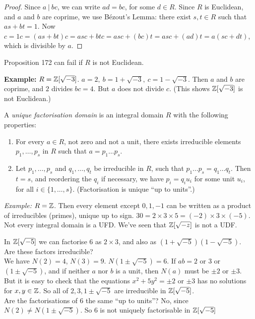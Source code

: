 \documentclass[twoside]{scrartcl}
\begin{document}
 \begin{proof}
 Since $a ~|~ bc$, we can write $ad = bc$, for some $d \in R$. Since $R$ is Euclidean, and $a$ and $b$ are coprime, we use B\'{e}zout's Lemma: there exist $s,t \in R$ such that $as + bt = 1$. Now $c = 1c = (as + bt)c = asc + btc = asc + (bc)t = asc + (ad)t = a(sc + dt)$, which is divisible by $a$. 
 \end{proof}\vspace*{5pt}
 
 Proposition 172 can fail if $R$ is not Euclidean.
 
 \textbf{Example:} $R = \mathbb{Z}[\sqrt{-3}]$. $a = 2, ~b = 1 + \sqrt{-3},~ c = 1-\sqrt{-3}$. Then $a$ and $b$ are coprime, and $2$ divides $bc = 4$. But $a$ does not divide $c$. (This shows $\mathbb{Z}[\sqrt{-3}]$ is not Euclidean.)\\
 
 \begin{definition} A \emph{unique factorisation domain} is an integral domain $R$ with the following properties:\begin{enumerate}
\item For every $a \in R$, not zero and not a unit, there exists irreducible elements $p_1,\dots,p_s$ in $R$ such that $a = p_1\dots p_s$.
\item Let $p_1,\dots,p_s$ and $q_1,\dots,q_t$ be irreducible in $R$, such that $p_1\dots p_s = q_1\dots q_t$. Then $t = s$, and reordering the $q_i$ if necessary, we have $p_i = q_iu_i$ for some unit $u_i$, for all $i \in \{1,\dots,s\}$. (Factorisation is unique ``up to units''.)
\end{enumerate} \end{definition}

\textit{Example:} $R = \mathbb{Z}$. Then every element except $0,1,-1$ can be written as a product of irreducibles (primes), unique up to sign. $30 = 2\times 3 \times 5 = (-2) \times 3 \times (-5)$.\\

  
 Not   
 every integral domain is a UFD. We've seen that $\mathbb{Z}[\sqrt{-z}]$ is not a UDF.\\
  
\begin{example} In $\mathbb{Z}[\sqrt{-5}]$ we can factorise $6$ as $2\times 3$, and also as $(1 + \sqrt{-5})(1-\sqrt{-5})$. Are these factors irreducible?\vspace*{5pt}\\ We have $N(2) = 4$, $N(3) = 9$. $N(1 \pm \sqrt{-5}) = 6$. If $ab = 2$ or $3$ or $(1 \pm \sqrt{-5})$, and if neither $a$ nor $b$ is a unit, then $N(a)$ must be $\pm 2$ or $\pm 3$. But it is easy to check that the equations $x^2 + 5y^2 = \pm 2$ or $\pm 3$ has no solutions for $x,y \in \mathbb{Z}$. So all of $2,3,1\pm \sqrt{-5}$ are irreducible in $\mathbb{Z}[\sqrt{-5}]$. \vspace*{5pt}\\ Are the factorisations of $6$ the same ``up to units''? No, since $N(2) \neq N(1 \pm \sqrt{-5})$. So $6$ is not uniquely factorisable in $\mathbb{Z}[\sqrt{-5}]$
	
\end{example}
\end{document}
